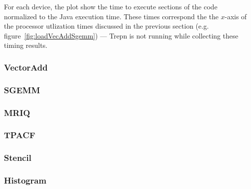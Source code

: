 For each device, the plot show the time to execute sections of the code normalized
  to the Java execution time.
These times correspond the the $x$-axis of the processor utlization times discussed
  in the previous section (e.g. figure~\ref{fig:loadVecAddSgemm}) --- Trepn is not
  running while collecting these timing results.

\subsubsection{VectorAdd}

\subsubsection{SGEMM}

\subsubsection{MRIQ}

\subsubsection{TPACF}

\subsubsection{Stencil}

\subsubsection{Histogram}

